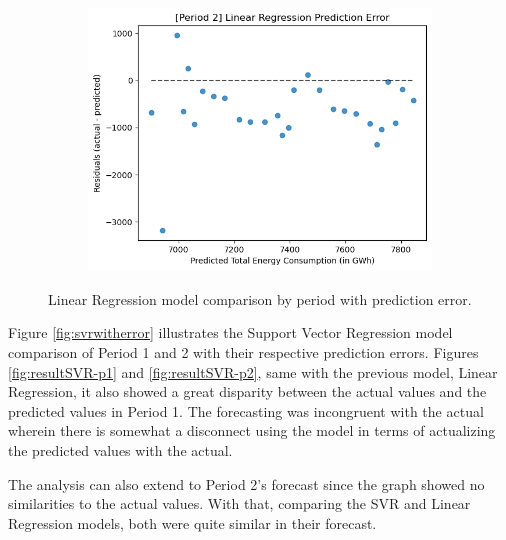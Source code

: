 \documentclass[runningheads]{llncs}
\begin{document}
\begin{center}
\begin{figure}[h]
\begin{subfigure}[h]{0.60\textwidth}
         \includegraphics[width=\textwidth]{results/lr/erp2.png}
         \caption{}
         \label{fig:errorLR-p2}
    \end{subfigure}
    \caption{Linear Regression model comparison by period with prediction error.}
    \label{fig:lrwitherror}
\end{figure}
\end{center}

Figure \ref{fig:svrwitherror} illustrates the Support Vector Regression model comparison of Period 1 and 2 with their respective prediction errors. Figures \ref{fig:resultSVR-p1} and \ref{fig:resultSVR-p2}, same with the previous model, Linear Regression, it also showed a great disparity between the actual values and the predicted values in Period 1. The forecasting was incongruent with the actual wherein there is somewhat a disconnect using the model in terms of actualizing the predicted values with the actual. 

The analysis can also extend to Period 2's forecast since the graph showed no similarities to the actual values. With that, comparing the SVR and Linear Regression models, both were quite similar in their forecast.
\end{document}
